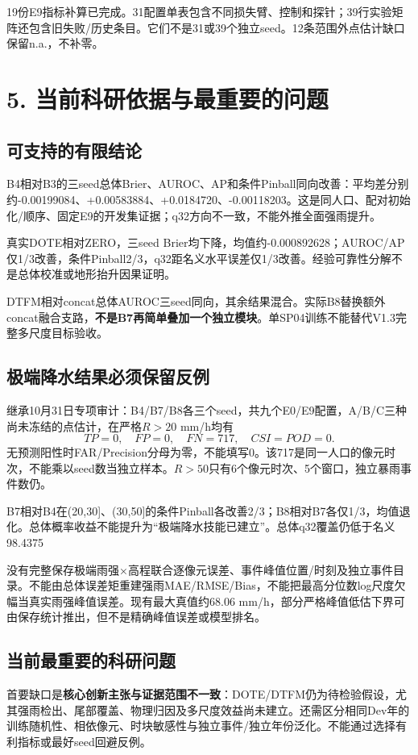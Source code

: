 \documentclass[UTF8,a4paper,10pt,fontset=none]{ctexart}
\newcommand{\key}[1]{\textcolor{ink}{\textbf{#1}}}
\begin{document}
19份E9指标补算已完成。31配置单表包含不同损失臂、控制和探针；39行实验矩阵还包含旧失败/历史条目。它们不是31或39个独立seed。12条范围外点估计缺口保留n.a.，不补零。

\clearpage
\section*{5. 当前科研依据与最重要的问题}
\subsection*{可支持的有限结论}
B4相对B3的三seed总体Brier、AUROC、AP和条件Pinball同向改善：平均差分别约-0.00199084、+0.00583884、+0.0184720、-0.00118203。这是同人口、配对初始化/顺序、固定E9的开发集证据；q32方向不一致，不能外推全面强雨提升。

真实DOTE相对ZERO，三seed Brier均下降，均值约-0.000892628；AUROC/AP仅1/3改善，条件Pinball2/3，q32距名义水平误差仅1/3改善。经验可靠性分解不是总体校准或地形抬升因果证明。

DTFM相对concat总体AUROC三seed同向，其余结果混合。实际B8替换额外concat融合支路，\textbf{不是B7再简单叠加一个独立模块}。单SP04训练不能替代V1.3完整多尺度目标验收。

\subsection*{极端降水结果必须保留反例}
继承10月31日专项审计：B4/B7/B8各三个seed，共九个E0/E9配置，A/B/C三种尚未冻结的点估计，在严格$R>20$ mm/h均有
\[
TP=0,\quad FP=0,\quad FN=717,\quad CSI=POD=0.
\]
无预测阳性时FAR/Precision分母为零，不能填写0。该717是同一人口的像元时次，不能乘以seed数当独立样本。$R>50$只有6个像元时次、5个窗口，独立暴雨事件数仍。

B7相对B4在(20,30]、(30,50]的条件Pinball各改善2/3；B8相对B7各仅1/3，均值退化。总体概率收益不能提升为“极端降水技能已建立”。总体q32覆盖仍低于名义98.4375%

没有完整保存极端雨强×高程联合逐像元误差、事件峰值位置/时刻及独立事件目录。不能由总体误差矩重建强雨MAE/RMSE/Bias，不能把最高分位数log尺度欠幅当真实雨强峰值误差。现有最大真值约68.06 mm/h，部分严格峰值低估下界可由保存统计推出，但不是精确峰值误差或模型排名。

\subsection*{当前最重要的科研问题}
首要缺口是\key{核心创新主张与证据范围不一致}：DOTE/DTFM仍为待检验假设，尤其强雨检出、尾部覆盖、物理归因及多尺度效益尚未建立。还需区分相同Dev年的训练随机性、相依像元、时块敏感性与独立事件/独立年份泛化。不能通过选择有利指标或最好seed回避反例。
\end{document}
